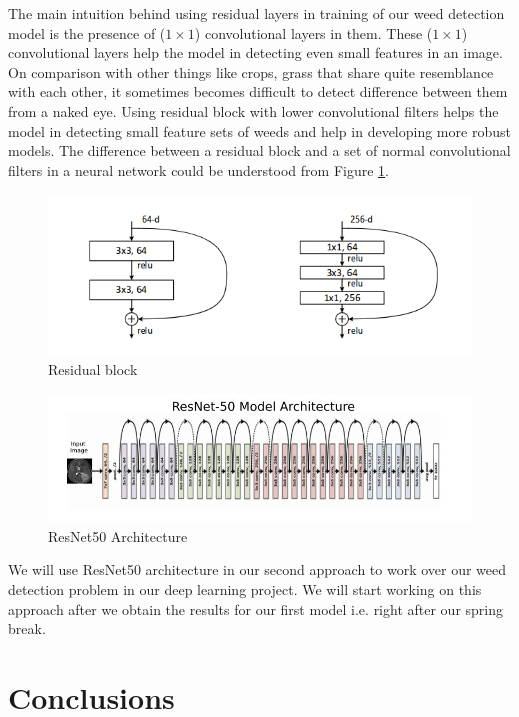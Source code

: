 \documentclass{report}
\begin{document}
The main intuition behind using residual layers in training of our weed detection model is the presence of ($1 \times 1$) convolutional layers in them. These ($1 \times 1$) convolutional layers help the model in detecting even small features in an image. On comparison with other things like crops, grass that share quite resemblance with each other, it sometimes becomes difficult to detect difference between them from a naked eye. Using residual block with lower convolutional filters helps the model in detecting small feature sets of weeds and help in developing more robust models. The difference between a residual block and a set of normal convolutional filters in a neural network could be understood from Figure \ref{fig:ResidualBlock}. 

\begin{figure}[H]
    \centering
    \includegraphics[width=\textwidth]{ResnetBlock.png}
    \caption{Residual block }
    \label{fig:ResidualBlock}
\end{figure}


\begin{figure}[H]
    \centering
    \includegraphics[width=\textwidth]{Resnet50.jpg}
    \caption{ResNet50 Architecture}
    \label{fig:Resnet50}
\end{figure}

We will use ResNet50 architecture in our second approach to work over our weed detection problem in our deep learning project. We will start working on this approach after we obtain the results for our first model i.e. right after our spring break.


\section{Conclusions}
\end{document}
